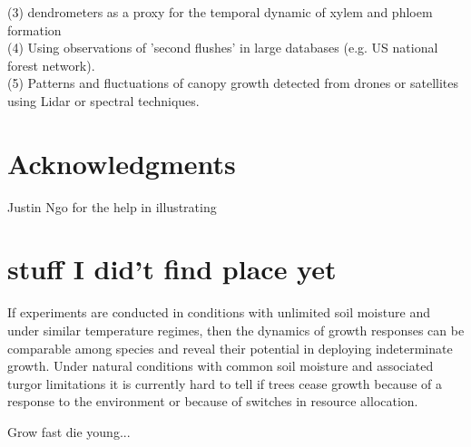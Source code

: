 \documentclass{article}
\begin{document}
	(3) dendrometers as a proxy for the temporal dynamic of xylem and phloem formation \\
	
	(4) Using observations of 'second flushes' in large databases (e.g. US national forest network). \\
	
	(5) Patterns and fluctuations of canopy growth detected from drones or satellites using Lidar or spectral techniques.
	

	

	
\section*{Acknowledgments}
	Justin Ngo for the help in illustrating
	


	
	

	
	\pagebreak
	

	\newpage
\section*{stuff I did't find place yet}

	
If experiments are conducted in conditions with unlimited soil moisture and under similar temperature regimes, then the dynamics of growth responses can be comparable among species and reveal their potential in deploying indeterminate growth. Under natural conditions with common soil moisture and associated turgor limitations it is currently hard to tell if trees cease growth because of a response to the environment or because of switches in resource allocation. 

 Grow fast die young...
 
 
	

	
	\newpage
	
	
	
	
	
	
\end{document}
